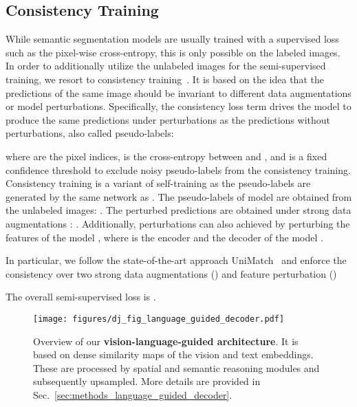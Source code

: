 \documentclass[10pt,twocolumn,letterpaper]{article}
\begin{document}
\subsection{Consistency Training}
\label{sec:methods_consistency_training}

While semantic segmentation models are usually trained with a supervised loss  such as the pixel-wise cross-entropy, this is only possible on the labeled images. 
In order to additionally utilize the unlabeled images for the semi-supervised training, we resort to consistency training~\cite{sohn2020fixmatch,chen2021semi,yang2023revisiting}. It is based on the idea that the predictions of the same image should be invariant to different data augmentations or model perturbations. Specifically, the consistency loss term  drives the model to produce the same predictions  under perturbations as the predictions  without perturbations, also called pseudo-labels:


where  are the pixel indices,  is the cross-entropy between  and , and  is a fixed confidence threshold to exclude noisy pseudo-labels  from the consistency training. Consistency training is a variant of self-training as the pseudo-labels  are generated by the same network as .
The pseudo-labels  of model  are obtained from the unlabeled images: . The perturbed predictions  are obtained under strong data augmentations : . Additionally, perturbations can also achieved by perturbing the features of the model , where  is the encoder and  the decoder of the model .

In particular, we follow the state-of-the-art approach UniMatch~\cite{yang2023revisiting} and enforce the consistency over two strong data augmentations () and feature perturbation ()



The overall semi-supervised loss is .

\begin{figure*}
    \centering
    \texttt{[image: figures/dj\_fig\_language\_guided\_decoder.pdf]}
    \caption{Overview of our \textbf{vision-language-guided architecture}. It is based on dense similarity maps of the vision and text embeddings. These are processed by spatial and semantic reasoning modules and subsequently upsampled. More details are provided in Sec.~\ref{sec:methods_language_guided_decoder}.}
    \label{fig:architecture}
\end{figure*}
\end{document}
